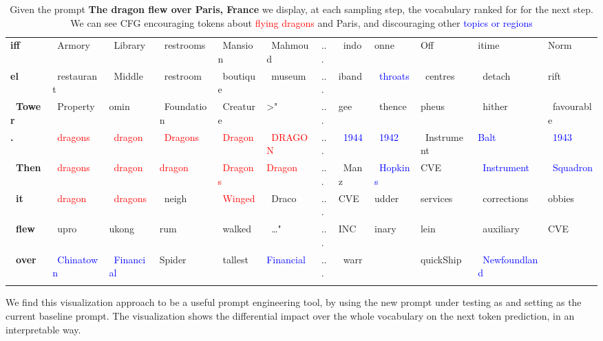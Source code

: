 \documentclass{article}
\begin{document}
\begin{table}
{\begin{tabular}{llllllllllll}
    \textbf{iff} & \ Armory & \ Library & \ restrooms & \ Mansion & \ Mahmoud & ... & \ indo & onne & Off & itime & Norm \\
    \textbf{el} & \textcolor{OliveGreen}{\ restaurant} & \ Middle & \textcolor{OliveGreen}{\ restroom} & \textcolor{OliveGreen}{\ boutique} & \textcolor{OliveGreen}{\ museum} & ... & iband & \ \textcolor{blue}{throats} & \ centres & \ detach & rift \\
    \textbf{\ Tower} & \ Property & omin & \ Foundation & \ Creature & >" & ... & gee & \ thence & pheus & \ hither & \ favourable \\
    \textbf{.} & \textcolor{red}{\ dragons} & \textcolor{red}{\ dragon} & \textcolor{red}{\ Dragons} & \textcolor{red}{\ Dragon} & \textcolor{red}{\ DRAGON} & ... & \ \textcolor{blue}{1944} & \ \textcolor{blue}{1942} & \ Instrument & \textcolor{blue}{Balt} & \ \textcolor{blue}{1943} \\
    \textbf{\ Then} & \textcolor{red}{\ dragons} & \textcolor{red}{\ dragon} & \textcolor{red}{dragon} & \textcolor{red}{\ Dragons} & \textcolor{red}{Dragon} & ... & \ Manz & \ \textcolor{blue}{Hopkins} & CVE & \ \textcolor{blue}{Instrument} & \ \textcolor{blue}{Squadron} \\
    \textbf{\ it} & \textcolor{red}{\ dragon} & \textcolor{red}{\ dragons} & \ neigh & \ \textcolor{red}{Winged} & \ Draco & ... & CVE & udder & services & \ corrections & obbies \\
    \textbf{\ flew} & \ upro & ukong & rum & \ walked & \ …" & ... & INC & inary & lein & \ auxiliary & CVE \\
    \textbf{\ over} & \textcolor{blue}{\ Chinatown} & \textcolor{blue}{\ Financial} & Spider & \ tallest & \textcolor{blue}{Financial} & ... & \ warr &  & quickShip & \ \textcolor{blue}{Newfoundland} & \\
    \bottomrule\\
    \end{tabular}
    }
    \caption{Given the prompt \textbf{The dragon flew over Paris, France} we display, at each sampling step, the vocabulary ranked for  for the next step. We can see CFG encouraging tokens about \textcolor{red}{flying dragons} and \textcolor{OliveGreen}{Paris}, and discouraging other \textcolor{blue}{topics or regions}}
\label{fig:viz}
\end{table}

We find this visualization approach to be a useful prompt engineering tool, by using the new prompt under testing as  and setting  as the current baseline prompt. The visualization shows the differential impact over the whole vocabulary on the next token prediction, in an interpretable way.
\end{document}
